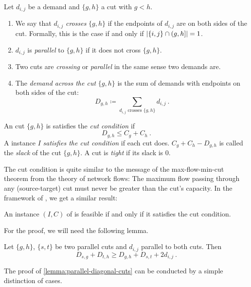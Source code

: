 \begin{definition}
	Let $d_{i, j}$ be a demand and $\{g, h\}$ a cut with $g < h$.
	\begin{enumerate}
		\item We say that $d_{i, j}$ \emph{crosses} $\{g, h\}$ if the endpoints of $d_{i, j}$ are on both sides of the cut.
		Formally, this is the case if and only if $\abs{\{i, j\} \cap (g, h]} = 1$.
		\item $d_{i, j}$ is \emph{parallel} to $\{g, h\}$ if it does not cross $\{g, h\}$.
		\item Two cuts are \emph{crossing} or \emph{parallel} in the same sense two demands are.
		\item The \emph{demand across the cut} $\{g, h\}$ is the sum of demands with endpoints on both sides of the cut:
		\begin{equation}
			\label{eq:cut-demand-definition}
			D_{g,h} \coloneqq \sum_{d_{i,j} \text{ crosses } \{g, h\} } d_{i, j}\ .
		\end{equation}
	\end{enumerate}
\end{definition}

\begin{definition}
	An cut $\{g, h\}$ is satisfies the \emph{cut condition} if
	\begin{equation}
		D_{g,h} \leq C_g + C_h \ .
	\end{equation}
	A \RRLWC instance $I$ \emph{satisfies the cut condition} if each cut does.
	$C_g + C_h - D_{g,h}$ is called the \emph{slack} of the cut $\{g, h\}$.
	A cut is \emph{tight} if its slack is $0$.
\end{definition}

The cut condition is quite similar to the message of the max-flow-min-cut theorem from the theory of network flows:
The maximum flow passing through any (source-target) cut must never be greater than the cut's capacity.
In the framework of \RRLWC, we get a similar result:

\begin{theorem}
	\label{theo:cut-condition}
	An instance $(I, C)$ of \RRLWC is feasible if and only if it satisfies the cut condition.
\end{theorem}
For the proof, we will need the following lemma.
\begin{lemma}
	\label{lemma:parallel-diagonal-cuts}
	Let $\{g, h\}$, $\{s, t\}$ be two parallel cuts and $d_{i, j}$ parallel to both cuts.
	Then
	\begin{equation}
		D_{s,g} + D_{t,h} \geq D_{g,h} + D_{s,t} + 2 d_{i,j} \ .
	\end{equation}
\end{lemma}
The proof of \cref{lemma:parallel-diagonal-cuts} can be conducted by a simple distinction of cases.

